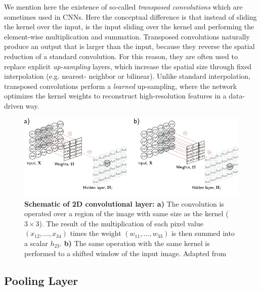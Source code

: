We mention here the existence of so-called \textit{transposed convolutions} which are sometimes used in CNNs. Here the 
conceptual difference is that instead of sliding the kernel over the input, is the input sliding over the kernel and 
performing the element-wise multiplication and summation. Transposed convolutions naturally produce an output that is larger 
than the input, because they reverse the spatial reduction of a standard convolution. For this reason, they are often used 
to replace explicit \textit{up-sampling} layers, which increase the spatial size through fixed interpolation (e.g. nearest-
neighbor or bilinear). Unlike standard interpolation, transposed convolutions perform a \textit{learned} up-sampling, 
where the network optimizes the kernel weights to reconstruct high-resolution features in a data-driven way. 

\begin{figure}[H]
    \centering
    \includegraphics[width=\textwidth]{figures/Intro/conv.pdf}
    \caption{\textbf{Schematic of 2D convolutional layer:  a) } The convolution is operated over a region of the image 
    with same size as the kernel ($3 \times 3$). The result of the multiplication of each pixel value $(x_{12},...,x_{34})$ 
    times the weight $(w_{11},...,w_{33})$ is then summed into a scalar $h_{23}$. \textbf{b)} The same operation with 
    the same kernel is performed to a shifted window of the input image.
    Adapted from \cite{prince2023understanding}}
    \label{fig:conv}
\end{figure}

\subsection{Pooling Layer}

